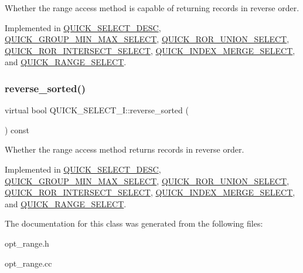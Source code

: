 Whether the range access method is capable of returning records in reverse order. 

Implemented in \mbox{\hyperlink{classQUICK__SELECT__DESC_a2ac3395790181ce6e03646506650db69}{Q\+U\+I\+C\+K\+\_\+\+S\+E\+L\+E\+C\+T\+\_\+\+D\+E\+SC}}, \mbox{\hyperlink{classQUICK__GROUP__MIN__MAX__SELECT_aa3fd8256056dd72cc9baf46df5fca548}{Q\+U\+I\+C\+K\+\_\+\+G\+R\+O\+U\+P\+\_\+\+M\+I\+N\+\_\+\+M\+A\+X\+\_\+\+S\+E\+L\+E\+CT}}, \mbox{\hyperlink{classQUICK__ROR__UNION__SELECT_a7f3da1479da93c9dfaee4c9edb944fb7}{Q\+U\+I\+C\+K\+\_\+\+R\+O\+R\+\_\+\+U\+N\+I\+O\+N\+\_\+\+S\+E\+L\+E\+CT}}, \mbox{\hyperlink{classQUICK__ROR__INTERSECT__SELECT_a3973616a394ee8cd2db776cd05ec2de8}{Q\+U\+I\+C\+K\+\_\+\+R\+O\+R\+\_\+\+I\+N\+T\+E\+R\+S\+E\+C\+T\+\_\+\+S\+E\+L\+E\+CT}}, \mbox{\hyperlink{classQUICK__INDEX__MERGE__SELECT_a38057df021af679b810f39d5f0619161}{Q\+U\+I\+C\+K\+\_\+\+I\+N\+D\+E\+X\+\_\+\+M\+E\+R\+G\+E\+\_\+\+S\+E\+L\+E\+CT}}, and \mbox{\hyperlink{classQUICK__RANGE__SELECT_a91c847083168b315d7a92d7e2e1d5485}{Q\+U\+I\+C\+K\+\_\+\+R\+A\+N\+G\+E\+\_\+\+S\+E\+L\+E\+CT}}.

\mbox{\label{classQUICK__SELECT__I_a686e8770fe10ac41bafdcf6d0c74dff3}} 
\subsubsection{\texorpdfstring{reverse\+\_\+sorted()}{reverse\_sorted()}}
{\footnotesize\ttfamily virtual bool Q\+U\+I\+C\+K\+\_\+\+S\+E\+L\+E\+C\+T\+\_\+\+I\+::reverse\+\_\+sorted (\begin{DoxyParamCaption}{ }\end{DoxyParamCaption}) const\hspace{0.3cm}{\ttfamily [pure virtual]}}

Whether the range access method returns records in reverse order. 

Implemented in \mbox{\hyperlink{classQUICK__SELECT__DESC_a1f9448b2def7b3aba93f9fbeee99a1cb}{Q\+U\+I\+C\+K\+\_\+\+S\+E\+L\+E\+C\+T\+\_\+\+D\+E\+SC}}, \mbox{\hyperlink{classQUICK__GROUP__MIN__MAX__SELECT_a4e5ee5272e481df74aeca818374c50ec}{Q\+U\+I\+C\+K\+\_\+\+G\+R\+O\+U\+P\+\_\+\+M\+I\+N\+\_\+\+M\+A\+X\+\_\+\+S\+E\+L\+E\+CT}}, \mbox{\hyperlink{classQUICK__ROR__UNION__SELECT_a22d0dd967733702cd36538287a3d5d7f}{Q\+U\+I\+C\+K\+\_\+\+R\+O\+R\+\_\+\+U\+N\+I\+O\+N\+\_\+\+S\+E\+L\+E\+CT}}, \mbox{\hyperlink{classQUICK__ROR__INTERSECT__SELECT_a9f21e9a517a9385f4fe406a42d32b017}{Q\+U\+I\+C\+K\+\_\+\+R\+O\+R\+\_\+\+I\+N\+T\+E\+R\+S\+E\+C\+T\+\_\+\+S\+E\+L\+E\+CT}}, \mbox{\hyperlink{classQUICK__INDEX__MERGE__SELECT_a36c1099e21429d7255000f67e4d3672f}{Q\+U\+I\+C\+K\+\_\+\+I\+N\+D\+E\+X\+\_\+\+M\+E\+R\+G\+E\+\_\+\+S\+E\+L\+E\+CT}}, and \mbox{\hyperlink{classQUICK__RANGE__SELECT_a4673131942deb7ef48be474cfc4030e9}{Q\+U\+I\+C\+K\+\_\+\+R\+A\+N\+G\+E\+\_\+\+S\+E\+L\+E\+CT}}.



The documentation for this class was generated from the following files\+:\begin{DoxyCompactItemize}
\item 
opt\+\_\+range.\+h\item 
opt\+\_\+range.\+cc\end{DoxyCompactItemize}
